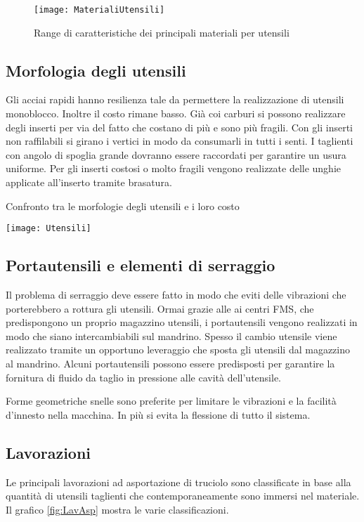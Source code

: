 \begin{figure}
\centering
\texttt{[image: MaterialiUtensili]}
\caption{Range di caratteristiche dei principali materiali per utensili}
\label{fig:MaterialiUtensili}
\end{figure}

\subsection{Morfologia degli utensili}
Gli acciai rapidi hanno resilienza tale da permettere la realizzazione di utensili monoblocco. Inoltre il costo rimane basso.
Già coi carburi si possono realizzare degli inserti per via del fatto che costano di più e sono più fragili.
Con gli inserti non raffilabili si girano i vertici in modo da consumarli in tutti i senti.
I taglienti con angolo di spoglia grande dovranno essere raccordati per garantire un usura uniforme.
Per gli inserti costosi o molto fragili vengono realizzate delle unghie applicate all'inserto tramite brasatura.

\begin{table}
\centering
\caption{Confronto tra le morfologie degli utensili e i loro costo}
\label{tab:ConfrontoUtensili}
\texttt{[image: Utensili]}
\end{table}

\subsection{Portautensili e elementi di serraggio}
Il problema di serraggio deve essere fatto in modo che eviti delle vibrazioni che porterebbero a rottura gli utensili.
Ormai grazie alle ai centri \ac{FMS}, che predispongono un proprio magazzino utensili, i portautensili vengono realizzati in modo che siano intercambiabili sul mandrino.
Spesso il cambio utensile viene realizzato tramite un opportuno leveraggio che sposta gli utensili dal magazzino al mandrino.
Alcuni portautensili possono essere predisposti per garantire la fornitura di fluido da taglio in pressione alle cavità dell'utensile.

Forme geometriche snelle sono preferite per limitare le vibrazioni e la facilità d'innesto nella macchina.
In più si evita la flessione di tutto il sistema.

\subsection{Lavorazioni}
Le principali lavorazioni ad asportazione di truciolo sono classificate in base alla quantità di utensili taglienti che contemporaneamente sono immersi nel materiale.
Il grafico \ref{fig:LavAsp} mostra le varie classificazioni.

